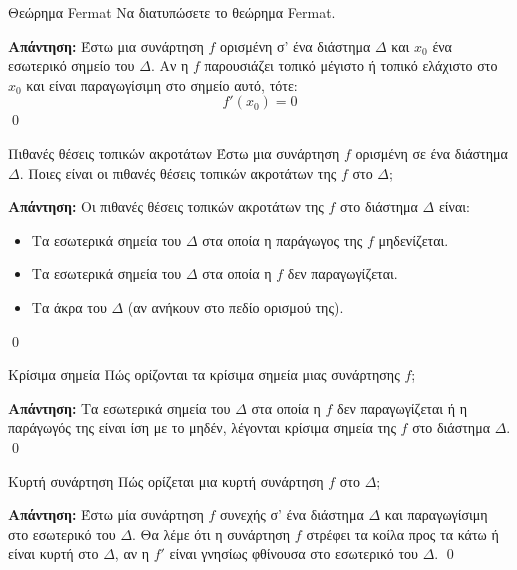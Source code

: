 \documentclass[a4paper, 12pt]{article}
\renewenvironment{proof}[1][\textbf{Απάντηση}]{%
  \par\noindent\textbf{#1:} \rmfamily}{\qed\par}
\begin{document}
\begin{theorem}{Θεώρημα Fermat}
  Να διατυπώσετε το θεώρημα Fermat.
\end{theorem}
\begin{proof}
  Έστω μια συνάρτηση $f$ ορισμένη σ’ ένα διάστημα $Δ$ και $x_0$ ένα εσωτερικό σημείο του $Δ$. Αν η $f$ παρουσιάζει τοπικό μέγιστο ή τοπικό ελάχιστο στο $x_0$ και είναι παραγωγίσιμη στο σημείο αυτό, τότε:
  $$f ′(x_0) = 0$$
\end{proof}

\begin{theorem}{Πιθανές θέσεις τοπικών ακροτάτων}
  Έστω μια συνάρτηση $f$ ορισμένη σε ένα διάστημα $Δ$. Ποιες είναι οι πιθανές θέσεις τοπικών ακροτάτων της $f$ στο $Δ$;
\end{theorem}
\begin{proof}
  Οι πιθανές θέσεις τοπικών ακροτάτων της $f$ στο διάστημα $Δ$ είναι:
  \begin{itemize}
    \item Τα εσωτερικά σημεία του $Δ$ στα οποία η παράγωγος της $f$ μηδενίζεται.
    \item Τα εσωτερικά σημεία του $Δ$ στα οποία η $f$ δεν παραγωγίζεται.
    \item Τα άκρα του $Δ$ (αν ανήκουν στο πεδίο ορισμού της).
  \end{itemize}
\end{proof}

\begin{theorem}{Κρίσιμα σημεία}
  Πώς ορίζονται τα κρίσιμα σημεία μιας συνάρτησης $f$;
\end{theorem}
\begin{proof}
  Τα εσωτερικά σημεία του $Δ$ στα οποία η $f$ δεν παραγωγίζεται ή η παράγωγός της είναι ίση με το μηδέν, λέγονται κρίσιμα σημεία της $f$ στο διάστημα $Δ$.
\end{proof}

\begin{theorem}{Κυρτή συνάρτηση}
  Πώς ορίζεται μια κυρτή συνάρτηση $f$ στο $Δ$;
\end{theorem}
\begin{proof}
  Έστω μία συνάρτηση $f$ συνεχής σ' ένα διάστημα $Δ$ και παραγωγίσιμη στο εσωτερικό του $Δ$. Θα λέμε ότι η συνάρτηση $f$ στρέφει τα κοίλα προς τα κάτω ή είναι κυρτή στο $Δ$, αν η $f '$ είναι γνησίως φθίνουσα στο εσωτερικό του $Δ$.
\end{proof}
\end{document}

